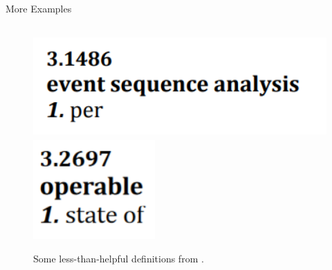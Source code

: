 \documentclass[22pt]{beamer}
\begin{document}
\begin{frame}[fragile]
\begin{textblock}{7.25}
\begin{block}{\fontsize{37}{20}\selectfont More Examples}
\begin{columns}
\begin{column}{0.475\textwidth}
\begin{center}
\begin{figure}
                            \vspace{2mm}

                            \includegraphics[height=3.9cm]{per.png}
                            \includegraphics[height=3.8cm]{state of.png}
                            \label{Fig:unhelpful-defs}
                            \caption{Some less-than-helpful definitions from
                                \cite[pp.~421, 170, 301, counterclockwise from top]{IEEE2017}.}
                        \end{figure}
                    \end{center}
                \end{column}
            \end{columns}

            \quad\\ %


\end{block}
\end{textblock}
\end{frame}
\end{document}
